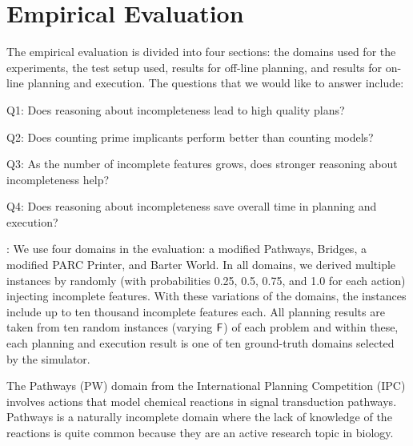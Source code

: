 \documentclass[letterpaper]{article}
\newenvironment{packed_itemize}{
\begin{itemize}
  \setlength{\itemsep}{1pt}
  \setlength{\parskip}{0pt}
  \setlength{\parsep}{0pt}
}{\end{itemize}}
\def\und#1{\noindent{\bf #1}:}
\begin{document}
\section{Empirical Evaluation}\label{sec:empirical}
%
The empirical evaluation is divided into four sections:  the domains used for the experiments, the test setup used, results for off-line planning, and results for on-line planning and execution.  The questions that we would like to answer include: 
\begin{packed_itemize}
\item Q1: Does reasoning about incompleteness lead to high quality plans?
\item Q2: Does counting prime implicants perform better than counting models?
\item Q3: As the number of incomplete features grows, does stronger reasoning
about incompleteness help?
\item Q4: Does reasoning about incompleteness save overall time in planning and execution?
\end{packed_itemize}





\und{Domains} We use four domains in the evaluation: a modified Pathways,
Bridges,  a modified PARC Printer, and Barter World.  In
all domains, we derived multiple instances by randomly (with probabilities 0.25,
0.5, 0.75, and 1.0 for each action) injecting incomplete  features.   
With these variations of the domains, the instances include up to ten thousand
incomplete  features each. All planning results are taken from ten random
instances (varying $\sf F$) of each problem and within these, each planning
and execution result is one of ten ground-truth domains selected by the
simulator.

The Pathways (PW) domain from the International Planning Competition  (IPC) involves actions that model chemical reactions in signal
transduction pathways.  Pathways is a naturally incomplete domain where the lack
of knowledge of the reactions is quite common because they are an active
research topic in biology.  
\end{document}
